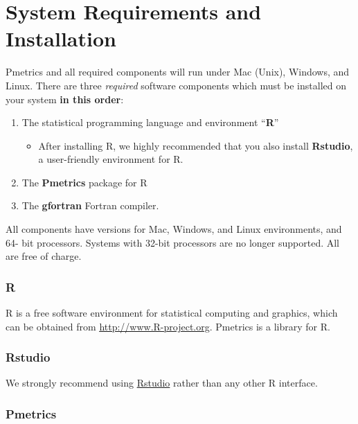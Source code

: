 \documentclass[
]{book}
\providecommand{\tightlist}{%
  \setlength{\itemsep}{0pt}\setlength{\parskip}{0pt}}
\begin{document}
\hypertarget{system-requirements-and-installation}{%
\section{System Requirements and Installation}\label{system-requirements-and-installation}}

Pmetrics and all required components will run under Mac (Unix), Windows,
and Linux. There are three \emph{required} software components
which must be installed on your system \textbf{in this order}:

\begin{enumerate}
\def\labelenumi{\arabic{enumi}.}
\item
  The statistical programming language and environment ``\textbf{R}''

  \begin{itemize}
  \tightlist
  \item
    After installing R, we highly recommended that you also install
    \textbf{Rstudio}, a user-friendly environment for R.
  \end{itemize}
\item
  The \textbf{Pmetrics} package for R
\item
  The \textbf{gfortran} Fortran compiler.
\end{enumerate}

All components have versions for Mac, Windows, and Linux environments,
and 64- bit processors. Systems with 32-bit processors are no longer
supported. All are free of charge.

\hypertarget{r}{%
\subsubsection{R}\label{r}}

R is a free software environment for statistical computing and graphics,
which can be obtained from
\href{http://www.R-project.org}{\underline{http://www.R-project.org}}.
Pmetrics is a library for R.

\hypertarget{rstudio}{%
\subsubsection{Rstudio}\label{rstudio}}

We strongly recommend using \href{http://rstudio.org/}{Rstudio} rather than any
other R interface.

\hypertarget{pmetrics}{%
\subsubsection{Pmetrics}\label{pmetrics}}
\end{document}
